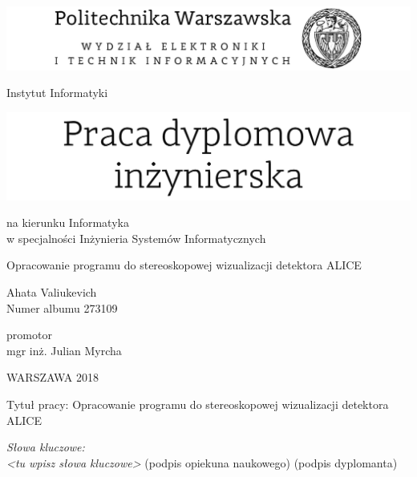 


\thispagestyle{empty}
\center
\includegraphics[scale=1]{PolitechnikaWarszawska}

\vspace{12mm}

\normalsize
Instytut Informatyki


\center
\includegraphics[scale=1]{PracaDyplomowa}

\vspace{12mm}

\normalsize
na kierunku Informatyka \\ 
w specjalności Inżynieria Systemów Informatycznych \\

\vspace{15mm}

\Large 
Opracowanie programu do stereoskopowej wizualizacji detektora ALICE \\ 

\vspace{17mm}

\huge 
Ahata Valiukevich  \\ 
\normalsize 
Numer albumu 273109 \\ 

\vspace{17mm}

promotor \\
mgr inż. Julian Myrcha \\

\vspace{15mm}

WARSZAWA 2018 

\newpage
\thispagestyle{empty}
\phantom{Nothing here}
\newpage
\clearpage
\phantom{Here neither}

\setcounter{page}{3}
\vspace{-1.5cm}
\begin{flushleft}
	Tytuł pracy: Opracowanie programu do stereoskopowej wizualizacji detektora ALICE 
\end{flushleft}
\vspace{0.5cm}
\vspace{0.5cm}
\noindent \textit{Słowa kluczowe: \\ <tu wpisz słowa kluczowe>} 
\vfill
(podpis opiekuna naukowego) \hfill (podpis dyplomanta)

